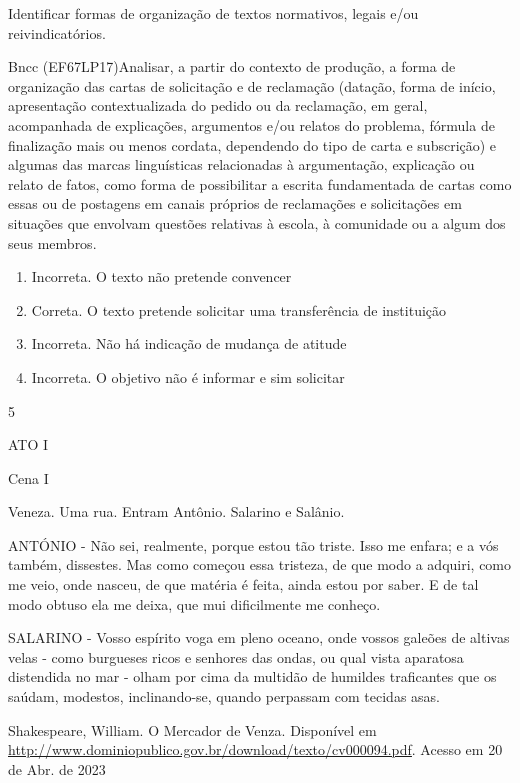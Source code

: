 {{\begin{itemize}
\begin{itemize}
Identificar formas de organização de textos normativos, legais e/ou
reivindicatórios.

Bncc (EF67LP17)Analisar, a partir do contexto de produção, a forma de
organização das cartas de solicitação e de reclamação (datação, forma de
início, apresentação contextualizada do pedido ou da reclamação, em
geral, acompanhada de explicações, argumentos e/ou relatos do problema,
fórmula de finalização mais ou menos cordata, dependendo do tipo de
carta e subscrição) e algumas das marcas linguísticas relacionadas à
argumentação, explicação ou relato de fatos, como forma de possibilitar
a escrita fundamentada de cartas como essas ou de postagens em canais
próprios de reclamações e solicitações em situações que envolvam
questões relativas à escola, à comunidade ou a algum dos seus membros.

\begin{enumerate}
\def\labelenumi{\arabic{enumi}.}
\item
  Incorreta. O texto não pretende convencer
\item
  Correta. O texto pretende solicitar uma transferência de instituição
\item
  Incorreta. Não há indicação de mudança de atitude
\item
  Incorreta. O objetivo não é informar e sim solicitar
\end{enumerate}

\num{5}

ATO I

Cena I

Veneza. Uma rua. Entram Antônio. Salarino e Salânio.

ANTÓNIO - Não sei, realmente, porque estou tão triste. Isso me enfara; e
a vós também, dissestes. Mas como começou essa tristeza, de que modo a
adquiri, como me veio, onde nasceu, de que matéria é feita, ainda estou
por saber. E de tal modo obtuso ela me deixa, que mui dificilmente me
conheço.

SALARINO - Vosso espírito voga em pleno oceano, onde vossos galeões de
altivas velas - como burgueses ricos e senhores das ondas, ou qual vista
aparatosa distendida no mar - olham por cima da multidão de humildes
traficantes que os saúdam, modestos, inclinando-se, quando perpassam com
tecidas asas.

Shakespeare, William. O Mercador de Venza. Disponível em
\href{http://www.dominiopublico.gov.br/download/texto/cv000094.pdf}{\uline{http://www.dominiopublico.gov.br/download/texto/cv000094.pdf}}.
Acesso em 20 de Abr. de 2023


\end{itemize}
\end{itemize}}}
